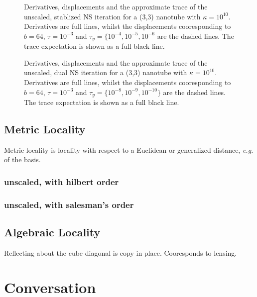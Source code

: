 \documentclass[letterpaper,twocolumn,amsmath,amsfont,amssymb,english,aps,jcp,preprintnumbers,groupaddress,nofootinbib,tightenlines]{revtex4}
\begin{document}
\begin{figure}[h]
\caption{Derivatives, displacements and the approximate trace of the unscaled, stablized NS iteration for a (3,3)
nanotube with $\kappa =10^{10}$.
Derivatives are full lines, whilst the displacements cooresponding to $b=64$, $\tau=10^{-3}$ and
$\tau_y=\{10^{-4}, 10^{-5}, 10^{-6}$  are the dashed lines.  The trace expectation is shown as a full black line. }
\end{figure}


\begin{figure}[h]
\caption{Derivatives, displacements and the approximate trace of the unscaled, dual NS iteration for a (3,3) nanotube with $\kappa =10^{10}$.
Derivatives are full lines, whilst the displacements cooresponding to $b=64$, $\tau=10^{-3}$ and $\tau_y=\{10^{-8}, 10^{-9}, 10^{-10}\}$
are the dashed lines.  The trace expectation is shown as a full black line. }
\end{figure}

\subsection{Metric Locality}
Metric locality is locality with respect to a Euclidean or generalized distance, {\em e.g.} of the basis.

\subsubsection{unscaled, with hilbert order}

\subsubsection{unscaled, with salesman's order}

\subsection{Algebraic  Locality}

Reflecting about the cube diagonal is copy in place.  Cooresponds to lensing.


\section{Conversation}



\end{document}
